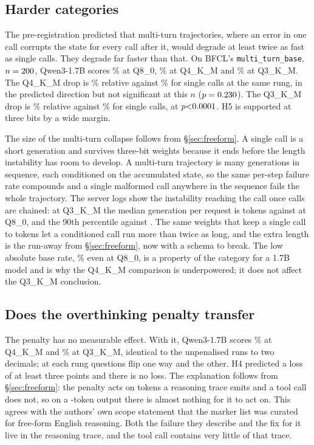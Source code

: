 \documentclass[10pt]{article}
\newcommand{\bfcl}{BFCL}
\newcommand{\qm}{Qwen3-1.7B}
\begin{document}
\subsection{Harder categories}

The pre-registration predicted that multi-turn trajectories, where an error in one call corrupts the state for every call after it, would degrade at least twice as fast as single calls. They degrade far faster than that. On \bfcl{}'s \texttt{multi\_turn\_base}, $n=200{}$, \qm{} scores \qtMtAccEight{}\% at Q8\_0, \qtMtAccFour{}\% at Q4\_K\_M and \qtMtAccThree{}\% at Q3\_K\_M. The Q4\_K\_M drop is \qtMtRelFour{}\% relative against \qtSingleRelFour{}\% for single calls at the same rung, in the predicted direction but not significant at this $n$ ($p=0.230{}$). The Q3\_K\_M drop is \qtMtRelThree{}\% relative against \qtSingleRelThree{}\% for single calls, at $p\qtMtPThree{}$. H5 is supported at three bits by a wide margin.

The size of the multi-turn collapse follows from \S\ref{sec:freeform}. A single call is a short generation and survives three-bit weights because it ends before the length instability has room to develop. A multi-turn trajectory is many generations in sequence, each conditioned on the accumulated state, so the same per-step failure rate compounds and a single malformed call anywhere in the sequence fails the whole trajectory. The server logs show the instability reaching the call once calls are chained: at Q3\_K\_M the median generation per request is \qtMtNgenMedThree{} tokens against \qtMtNgenMedEight{} at Q8\_0, and the 90th percentile \qtMtNgenPninezeroThree{} against \qtMtNgenPninezeroEight{}. The same weights that keep a single call to \qtToolNgenMedThree{} tokens let a conditioned call run more than twice as long, and the extra length is the run-away from \S\ref{sec:freeform}, now with a schema to break. The low absolute base rate, \qtMtAccEight{}\% even at Q8\_0, is a property of the category for a 1.7B model and is why the Q4\_K\_M comparison is underpowered; it does not affect the Q3\_K\_M conclusion.

\subsection{Does the overthinking penalty transfer}

The penalty has no measurable effect. With it, \qm{} scores \qtHfourAccFour{}\% at Q4\_K\_M and \qtHfourAccThree{}\% at Q3\_K\_M, identical to the unpenalised runs to two decimals; at each rung \qtHfourLostFour{} questions flip one way and \qtHfourGainedFour{} the other. H4 predicted a loss of at least three points and there is no loss. The explanation follows from \S\ref{sec:freeform}: the penalty acts on tokens a reasoning trace emits and a tool call does not, so on a \qtToolNgenMedThree{}-token output there is almost nothing for it to act on. This agrees with the authors' own scope statement that the marker list was curated for free-form English reasoning. Both the failure they describe and the fix for it live in the reasoning trace, and the tool call contains very little of that trace.
\end{document}
